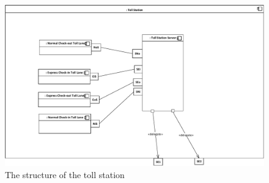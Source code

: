 \begin{figure}[H]
\centerline{\includegraphics[width=\textwidth]{img/composite_structure_diagrams/cscd_toll_station}}
\caption{The structure of the toll station}
\label{fig:csd_ts}
\end{figure}
